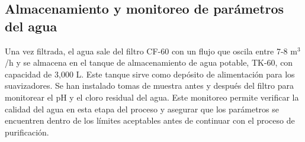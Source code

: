 \subsection*{Almacenamiento y monitoreo de parámetros del agua}

Una vez filtrada, el agua sale del filtro CF-60 con un flujo que oscila entre 7-8 m$^3$/h y se almacena en el tanque de almacenamiento de agua potable,
TK-60, con capacidad de 3,000 L. Este tanque sirve como depósito de alimentación para los suavizadores. Se han instalado tomas de muestra antes y
después del filtro para monitorear el pH y el cloro residual del agua. Este monitoreo permite verificar la calidad del agua en esta etapa del proceso y
asegurar que los parámetros se encuentren dentro de los límites aceptables antes de continuar con el proceso de purificación.



